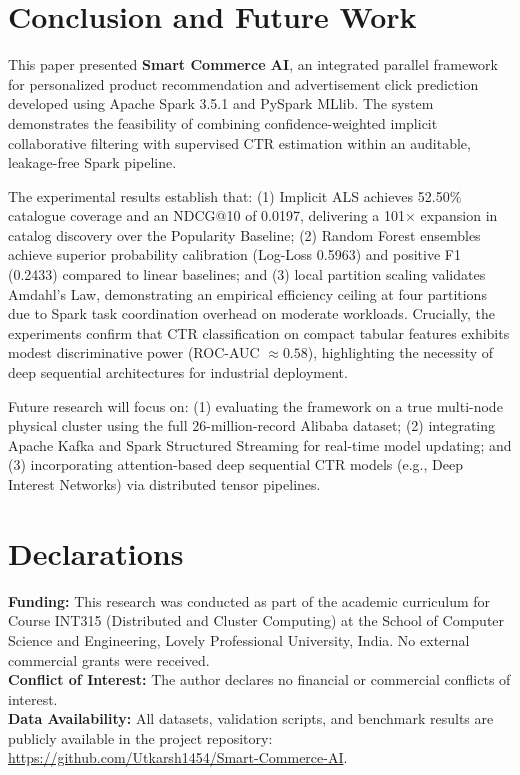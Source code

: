 \documentclass[10pt,a4paper,twoside]{article}
\begin{document}
\section{Conclusion and Future Work}
This paper presented \textbf{Smart Commerce AI}, an integrated parallel framework for personalized product recommendation and advertisement click prediction developed using Apache Spark 3.5.1 and PySpark MLlib. The system demonstrates the feasibility of combining confidence-weighted implicit collaborative filtering with supervised CTR estimation within an auditable, leakage-free Spark pipeline.

The experimental results establish that: (1) Implicit ALS achieves 52.50\% catalogue coverage and an NDCG@10 of 0.0197, delivering a 101$\times$ expansion in catalog discovery over the Popularity Baseline; (2) Random Forest ensembles achieve superior probability calibration (Log-Loss 0.5963) and positive F1 (0.2433) compared to linear baselines; and (3) local partition scaling validates Amdahl's Law, demonstrating an empirical efficiency ceiling at four partitions due to Spark task coordination overhead on moderate workloads. Crucially, the experiments confirm that CTR classification on compact tabular features exhibits modest discriminative power (ROC-AUC $\approx 0.58$), highlighting the necessity of deep sequential architectures for industrial deployment.

Future research will focus on: (1) evaluating the framework on a true multi-node physical cluster using the full 26-million-record Alibaba dataset; (2) integrating Apache Kafka and Spark Structured Streaming for real-time model updating; and (3) incorporating attention-based deep sequential CTR models (e.g., Deep Interest Networks) via distributed tensor pipelines.

\section*{Declarations}
\noindent\textbf{Funding:} This research was conducted as part of the academic curriculum for Course INT315 (Distributed and Cluster Computing) at the School of Computer Science and Engineering, Lovely Professional University, India. No external commercial grants were received.\\
\noindent\textbf{Conflict of Interest:} The author declares no financial or commercial conflicts of interest.\\
\noindent\textbf{Data Availability:} All datasets, validation scripts, and benchmark results are publicly available in the project repository: \url{https://github.com/Utkarsh1454/Smart-Commerce-AI}.
\end{document}
